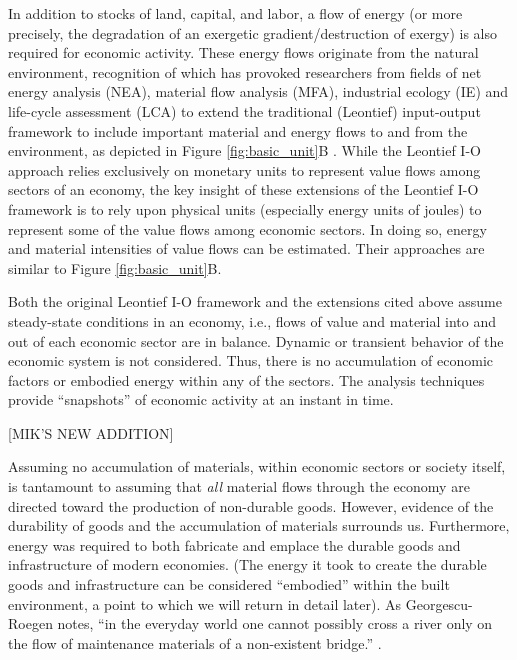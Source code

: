 In addition to stocks of land, capital, and labor, a flow of energy (or more precisely, the degradation of an exergetic gradient/destruction of exergy) is also required for economic activity. These energy flows originate from the natural environment, recognition of which has provoked researchers from fields of net energy analysis (NEA), material flow analysis (MFA), industrial ecology (IE) and life-cycle assessment (LCA) to extend the traditional (Leontief) input-output framework to include important material and energy flows to and from the environment, as depicted in Figure \ref{fig:basic_unit}B \cite{Carter1974,Bullard1975, Bullard1978, Herendeen1978, Costanza1980, Casler1984, Joshi1999, Suh2009}. While the Leontief I-O approach relies exclusively on monetary units to represent value flows among sectors of an economy, the key insight of these extensions of the Leontief I-O framework is to rely upon physical units (especially energy units of joules) to represent some of the value flows among economic sectors. In doing so, energy and material intensities of value flows can be estimated. Their approaches are similar to Figure \ref{fig:basic_unit}B. 

Both the original Leontief I-O framework and the extensions cited above assume steady-state conditions in an economy, i.e., flows of value and material into and out of each economic sector are in balance. Dynamic or transient behavior of the economic system is not considered. Thus, there is no accumulation of economic factors or embodied energy within any of the sectors. The analysis techniques provide ``snapshots'' of economic activity at an instant in time.

[MIK'S NEW ADDITION]

Assuming no accumulation of materials, within economic sectors or society itself, is tantamount to assuming that \emph{all} material flows through the economy are directed toward the production of non-durable goods. However, evidence of the durability of goods and the accumulation of materials surrounds us. Furthermore, energy was required to both fabricate and emplace the durable goods and infrastructure of modern economies. (The energy it took to create the durable goods and infrastructure can be considered ``embodied'' within the built environment, a point to which we will return in detail later). As Georgescu-Roegen notes, ``in the everyday world one cannot possibly cross a river only on the flow of maintenance materials of a non-existent bridge.'' \cite{G-R1975}. 

